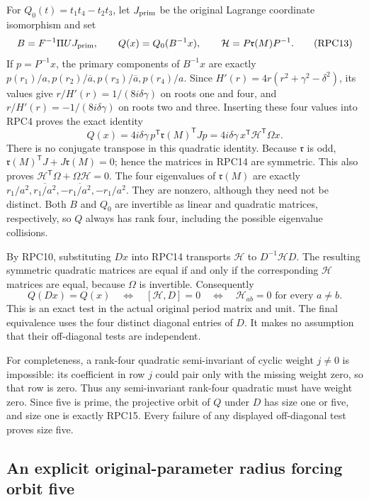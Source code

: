 \documentclass[11pt,a4paper]{article}
\begin{document}
For $Q_0(t)=t_1t_4-t_2t_3$, let $J_{\rm prim}$ be the original
Lagrange coordinate isomorphism and set
\[
 B=F^{-1}\Pi UJ_{\rm prim},\qquad Q(x)=Q_0(B^{-1}x),\qquad
 \mathcal H=P\mathfrak r(M)P^{-1}.
 \tag{RPC13}
\]
If $p=P^{-1}x$, the primary components of $B^{-1}x$ are exactly
$p(r_1)/a,p(r_2)/\overline a,p(r_3)/\overline a,p(r_4)/a$.
Since $H'(r)=4r(r^2+\gamma^2-\delta^2)$, its values give
$r/H'(r)=1/(8i\delta\gamma)$ on roots one and four, and
$r/H'(r)=-1/(8i\delta\gamma)$ on roots two and three. Inserting
these four values into RPC4 proves the exact identity
\[
 \boxed{\quad Q(x)=4i\delta\gamma\,
       p^{\mathsf T}\mathfrak r(M)^{\mathsf T}Jp
       =4i\delta\gamma\,x^{\mathsf T}\mathcal H^{\mathsf T}\Omega x.\quad}
 \tag{RPC14}
\]
There is no conjugate transpose in this quadratic identity. Because
$\mathfrak r$ is odd, $\mathfrak r(M)^{\mathsf T}J+J\mathfrak r(M)=0$; hence the matrices in
RPC14 are symmetric. This also proves
$\mathcal H^{\mathsf T}\Omega+\Omega\mathcal H=0$.
The four eigenvalues of $\mathfrak r(M)$ are exactly
$r_1/a^2,\overline{r_1/a^2},-\overline{r_1/a^2},-r_1/a^2$.
They are nonzero, although they need not be distinct. Both $B$ and
$Q_0$ are invertible as linear and quadratic matrices, respectively,
so $Q$ always has rank four, including the possible eigenvalue collisions.

By RPC10, substituting $Dx$ into RPC14 transports $\mathcal H$ to
$D^{-1}\mathcal H D$. The resulting symmetric quadratic matrices
are equal if and only if the corresponding $\mathcal H$ matrices
are equal, because $\Omega$ is invertible. Consequently
\[
 \boxed{\quad Q(Dx)=Q(x)\quad\Longleftrightarrow\quad
 [\mathcal H,D]=0\quad\Longleftrightarrow\quad
 \mathcal H_{ab}=0\text{ for every }a\ne b.\quad}
 \tag{RPC15}
\]
This is an exact test in the actual original period matrix and unit.
The final equivalence uses the four distinct diagonal entries of $D$.
It makes no assumption that their off-diagonal tests are independent.

For completeness, a rank-four quadratic semi-invariant of cyclic
weight $j\ne0$ is impossible: its coefficient in row $j$ could pair
only with the missing weight zero, so that row is zero. Thus any
semi-invariant rank-four quadratic must have weight zero. Since five
is prime, the projective orbit of $Q$ under $D$ has size one or five,
and size one is exactly RPC15. Every failure of any displayed
off-diagonal test proves size five.

\subsection{An explicit original-parameter radius forcing orbit five}
\end{document}
